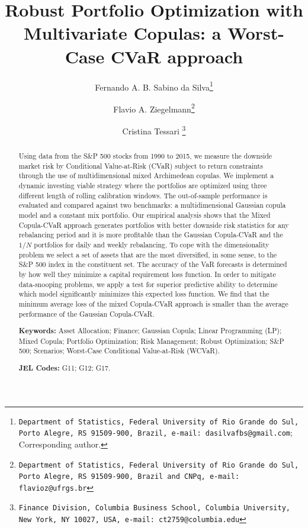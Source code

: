 \documentclass[a4paper,10pt]{article}
\begin{document}
\title{Robust Portfolio Optimization with Multivariate Copulas: a Worst-Case CVaR approach}
\author[]{ Fernando A. B. Sabino da Silva\thanks{\texttt{Department of Statistics, Federal University of Rio Grande do Sul, Porto Alegre, RS 91509-900, Brazil, e-mail: dasilvafbs@gmail.com}; Corresponding author.}}
\author[]{Flavio A. Ziegelmann\thanks{\texttt{Department of Statistics, Federal University of Rio Grande do Sul, Porto Alegre, RS 91509-900, Brazil and CNPq, e-mail: flavioz@ufrgs.br}}}
\author[]{Cristina Tessari \thanks{\texttt{Finance Division, Columbia Business School, Columbia University, New York, NY 10027, USA,
			e-mail: ct2759@columbia.edu}}}
\affil[]{}
\date{}
\maketitle

\begin{abstract}
Using data from the S\&P 500 stocks from 1990 to 2015, we measure the downside market risk by Conditional Value-at-Risk (CVaR) subject to return constraints through the use of multidimensional mixed Archimedean copulas. We implement a dynamic investing viable strategy where the portfolios are optimized using three different length of rolling calibration windows. The out-of-sample performance is evaluated and compared against two benchmarks: a multidimensional Gaussian copula model and a constant mix portfolio. Our empirical analysis shows that the Mixed Copula-CVaR approach generates portfolios with better downside risk statistics for any rebalancing period and it is more profitable than the Gaussian Copula-CVaR and the $1/N$ portfolios for daily and weekly rebalancing. To cope with the dimensionality problem we select a set of assets that are the most diversified, in some sense, to the S\&P 500 index in the constituent set. The accuracy of the VaR forecasts is determined by how well they minimize a capital requirement loss function. In order to mitigate data-snooping problems, we apply a test for superior predictive ability to determine which model significantly minimizes this expected loss function. We find that the minimum average loss of the mixed Copula-CVaR approach is smaller than the average performance of the Gaussian Copula-CVaR.


\smallskip

\smallskip

 \textbf{Keywords:} Asset Allocation; Finance; Gaussian Copula; Linear Programming (LP); Mixed Copula; Portfolio Optimization; Risk Management; Robust Optimization; S\&P 500; Scenarios; Worst-Case Conditional Value-at-Risk (WCVaR).

 \textbf{JEL Codes:} G11; G12; G17.
\end{abstract}
\end{document}
